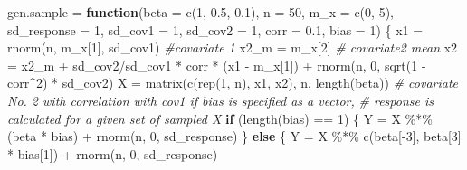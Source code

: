 \documentclass[
]{article}
\newenvironment{Shaded}{\begin{snugshade}}{\end{snugshade}}
\newcommand{\AttributeTok}[1]{\textcolor[rgb]{0.77,0.63,0.00}{#1}}
\newcommand{\CommentTok}[1]{\textcolor[rgb]{0.56,0.35,0.01}{\textit{#1}}}
\newcommand{\ControlFlowTok}[1]{\textcolor[rgb]{0.13,0.29,0.53}{\textbf{#1}}}
\newcommand{\DecValTok}[1]{\textcolor[rgb]{0.00,0.00,0.81}{#1}}
\newcommand{\FloatTok}[1]{\textcolor[rgb]{0.00,0.00,0.81}{#1}}
\newcommand{\FunctionTok}[1]{\textcolor[rgb]{0.00,0.00,0.00}{#1}}
\newcommand{\NormalTok}[1]{#1}
\newcommand{\OtherTok}[1]{\textcolor[rgb]{0.56,0.35,0.01}{#1}}
\newcommand{\SpecialCharTok}[1]{\textcolor[rgb]{0.00,0.00,0.00}{#1}}
\begin{document}
\begin{Shaded}
\begin{Highlighting}[]
\NormalTok{gen.sample }\OtherTok{=} \ControlFlowTok{function}\NormalTok{(}\AttributeTok{beta =} \FunctionTok{c}\NormalTok{(}\DecValTok{1}\NormalTok{, }\FloatTok{0.5}\NormalTok{, }\FloatTok{0.1}\NormalTok{), }\AttributeTok{n =} \DecValTok{50}\NormalTok{, }\AttributeTok{m\_x =} \FunctionTok{c}\NormalTok{(}\DecValTok{0}\NormalTok{, }\DecValTok{5}\NormalTok{), }\AttributeTok{sd\_response =} \DecValTok{1}\NormalTok{, }
    \AttributeTok{sd\_cov1 =} \DecValTok{1}\NormalTok{, }\AttributeTok{sd\_cov2 =} \DecValTok{1}\NormalTok{, }\AttributeTok{corr =} \FloatTok{0.1}\NormalTok{, }\AttributeTok{bias =} \DecValTok{1}\NormalTok{) \{}
\NormalTok{    x1 }\OtherTok{=} \FunctionTok{rnorm}\NormalTok{(n, m\_x[}\DecValTok{1}\NormalTok{], sd\_cov1)  }\CommentTok{\#covariate 1}
\NormalTok{    x2\_m }\OtherTok{=}\NormalTok{ m\_x[}\DecValTok{2}\NormalTok{]  }\CommentTok{\# covariate2 mean}
\NormalTok{    x2 }\OtherTok{=}\NormalTok{ x2\_m }\SpecialCharTok{+}\NormalTok{ sd\_cov2}\SpecialCharTok{/}\NormalTok{sd\_cov1 }\SpecialCharTok{*}\NormalTok{ corr }\SpecialCharTok{*}\NormalTok{ (x1 }\SpecialCharTok{{-}}\NormalTok{ m\_x[}\DecValTok{1}\NormalTok{]) }\SpecialCharTok{+} \FunctionTok{rnorm}\NormalTok{(n, }\DecValTok{0}\NormalTok{, }\FunctionTok{sqrt}\NormalTok{(}\DecValTok{1} \SpecialCharTok{{-}}\NormalTok{ corr}\SpecialCharTok{\^{}}\DecValTok{2}\NormalTok{) }\SpecialCharTok{*} 
\NormalTok{        sd\_cov2)}
\NormalTok{    X }\OtherTok{=} \FunctionTok{matrix}\NormalTok{(}\FunctionTok{c}\NormalTok{(}\FunctionTok{rep}\NormalTok{(}\DecValTok{1}\NormalTok{, n), x1, x2), n, }\FunctionTok{length}\NormalTok{(beta))}
    \CommentTok{\# covariate No. 2 with correlation with cov1 if bias is specified as a vector,}
    \CommentTok{\# response is calculated for a given set of sampled X}
    \ControlFlowTok{if}\NormalTok{ (}\FunctionTok{length}\NormalTok{(bias) }\SpecialCharTok{==} \DecValTok{1}\NormalTok{) \{}
\NormalTok{        Y }\OtherTok{=}\NormalTok{ X }\SpecialCharTok{\%*\%}\NormalTok{ (beta }\SpecialCharTok{*}\NormalTok{ bias) }\SpecialCharTok{+} \FunctionTok{rnorm}\NormalTok{(n, }\DecValTok{0}\NormalTok{, sd\_response)}
\NormalTok{    \} }\ControlFlowTok{else}\NormalTok{ \{}
\NormalTok{        Y }\OtherTok{=}\NormalTok{ X }\SpecialCharTok{\%*\%} \FunctionTok{c}\NormalTok{(beta[}\SpecialCharTok{{-}}\DecValTok{3}\NormalTok{], beta[}\DecValTok{3}\NormalTok{] }\SpecialCharTok{*}\NormalTok{ bias[}\DecValTok{1}\NormalTok{]) }\SpecialCharTok{+} \FunctionTok{rnorm}\NormalTok{(n, }\DecValTok{0}\NormalTok{, sd\_response)}

\end{Highlighting}
\end{Shaded}
\end{document}
